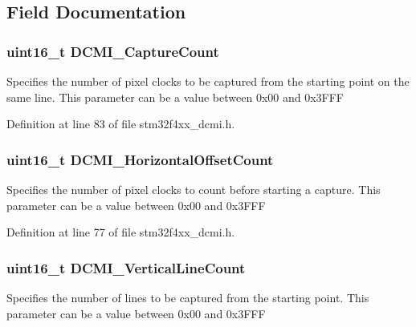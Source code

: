 \subsection{Field Documentation}
\hypertarget{struct_d_c_m_i___c_r_o_p_init_type_def_a7fe2fa515bf8d3fa989fedf6e4bd39e0}{
\subsubsection[{D\-C\-M\-I\-\_\-\-Capture\-Count}]{\setlength{\rightskip}{0pt plus 5cm}uint16\-\_\-t D\-C\-M\-I\-\_\-\-Capture\-Count}}\label{struct_d_c_m_i___c_r_o_p_init_type_def_a7fe2fa515bf8d3fa989fedf6e4bd39e0}
Specifies the number of pixel clocks to be captured from the starting point on the same line. This parameter can be a value between 0x00 and 0x3\-F\-F\-F 

Definition at line 83 of file stm32f4xx\-\_\-dcmi.\-h.

\hypertarget{struct_d_c_m_i___c_r_o_p_init_type_def_ae0b5043fbbed94113c749e24c150b542}{
\subsubsection[{D\-C\-M\-I\-\_\-\-Horizontal\-Offset\-Count}]{\setlength{\rightskip}{0pt plus 5cm}uint16\-\_\-t D\-C\-M\-I\-\_\-\-Horizontal\-Offset\-Count}}\label{struct_d_c_m_i___c_r_o_p_init_type_def_ae0b5043fbbed94113c749e24c150b542}
Specifies the number of pixel clocks to count before starting a capture. This parameter can be a value between 0x00 and 0x3\-F\-F\-F 

Definition at line 77 of file stm32f4xx\-\_\-dcmi.\-h.

\hypertarget{struct_d_c_m_i___c_r_o_p_init_type_def_a43586118e74eb0f625d56dad90fd381e}{
\subsubsection[{D\-C\-M\-I\-\_\-\-Vertical\-Line\-Count}]{\setlength{\rightskip}{0pt plus 5cm}uint16\-\_\-t D\-C\-M\-I\-\_\-\-Vertical\-Line\-Count}}\label{struct_d_c_m_i___c_r_o_p_init_type_def_a43586118e74eb0f625d56dad90fd381e}
Specifies the number of lines to be captured from the starting point. This parameter can be a value between 0x00 and 0x3\-F\-F\-F 

